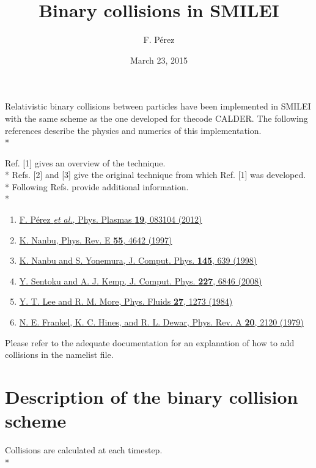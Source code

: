 \documentclass[11pt]{article}
\begin{document}
\title{Binary collisions in SMILEI}
\author{F. P\'erez}
\date{March 23, 2015}
\maketitle

\vfill
Relativistic binary collisions between particles have been implemented in SMILEI with the
same scheme as the one developed for thecode CALDER. The following references describe
the physics and numerics of this implementation.
\\*

Ref. [1] gives an overview of the technique.\\*
Refs. [2] and [3] give the original technique from which Ref. [1] was developed.\\*
Following Refs. provide additional information.\\*

\begin{enumerate}
\item \href{http://dx.doi.org/10.1063/1.4742167}{F. P\'erez \textit{et al.}, Phys. Plasmas \textbf{19}, 083104 (2012)}
\item \href{http://dx.doi.org/10.1103/PhysRevE.55.4642}{K. Nanbu, Phys. Rev. E \textbf{55}, 4642 (1997)}
\item \href{http://dx.doi.org/10.1006/jcph.1998.6049}{K. Nanbu and S. Yonemura, J. Comput. Phys. \textbf{145}, 639 (1998)}
\item \href{http://dx.doi.org/10.1016/j.jcp.2008.03.043}{Y. Sentoku and A. J. Kemp, J. Comput. Phys. \textbf{227}, 6846 (2008)}
\item \href{http://dx.doi.org/10.1063/1.864744}{Y. T. Lee and R. M. More, Phys. Fluids \textbf{27}, 1273 (1984)}
\item \href{http://dx.doi.org/10.1143/JPSJ.67.4084}{N. E. Frankel, K. C. Hines, and R. L. Dewar, Phys. Rev. A \textbf{20}, 2120 (1979)}
\end{enumerate}
\vfill

Please refer to the adequate documentation for an explanation of how to add collisions in the namelist file.

\vfill
\setcounter{tocdepth}{1}
\tableofcontents
\vfill

\clearpage


\section{Description of the binary collision scheme}
Collisions are calculated at each timestep.\\*
\end{document}
